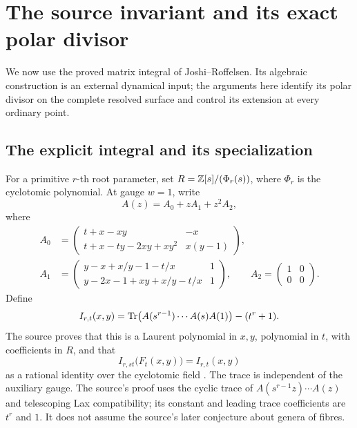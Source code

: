\section{The source invariant and its exact polar divisor}\label{sec:integral}

We now use the proved matrix integral of Joshi--Roffelsen. Its algebraic
construction is an external dynamical input; the arguments here identify
its polar divisor on the complete resolved surface and control its
extension at every ordinary point.

\subsection{The explicit integral and its specialization}

For a primitive \(r\)-th root parameter, set
\(R=\mathbb Z[s]/(\Phi_r(s))\), where \(\Phi_r\) is the cyclotomic
polynomial. At gauge \(w=1\), write
\begin{equation}\label{eq:source-matrix}
A(z)=A_0+zA_1+z^2A_2,
\end{equation}
where
\begin{align*}
A_0&=\begin{pmatrix}
t+x-xy&-x\\
t+x-ty-2xy+xy^2&x(y-1)
\end{pmatrix},\\[3pt]
A_1&=\begin{pmatrix}
y-x+x/y-1-t/x&1\\
y-2x-1+xy+x/y-t/x&1
\end{pmatrix},\qquad
A_2=\begin{pmatrix}1&0\\0&0\end{pmatrix}.
\end{align*}
Define
\begin{equation}\label{eq:source-integral}
I_{r,t}(x,y)=\operatorname{Tr}\bigl(A(s^{r-1})\cdots A(s)A(1)\bigr)-(t^r+1).
\end{equation}
The source proves that this is a Laurent polynomial in \(x,y\),
polynomial in \(t\), with coefficients in \(R\), and that
\begin{equation}\label{eq:invariance}
I_{r,st}\bigl(F_t(x,y)\bigr)=I_{r,t}(x,y)
\end{equation}
as a rational identity over the cyclotomic field
\citep[Theorem 3.1]{JoshiRoffelsen2026}. The trace is independent of
the auxiliary gauge. The source's proof uses the cyclic trace of
\(A(s^{r-1}z)\cdots A(z)\) and telescoping Lax compatibility;
its constant and leading trace coefficients are \(t^r\) and \(1\).
It does not assume the source's later conjecture about genera of fibres.

